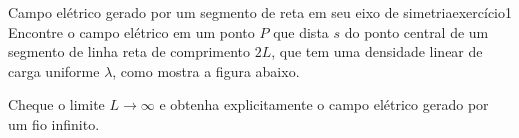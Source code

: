 \begin{exercício}{Campo elétrico gerado por um segmento de reta em seu eixo de simetria}{exercício1}
    Encontre o campo elétrico em um ponto \(P\) que dista \(s\) do ponto central de um segmento de linha reta de comprimento \(2L\), que tem uma densidade linear de carga uniforme \(\lambda\), como mostra a figura abaixo.

    \begin{center}
    \end{center}
    Cheque o limite \(L \to \infty\) e obtenha explicitamente o campo elétrico gerado por um fio infinito.
\end{exercício}
